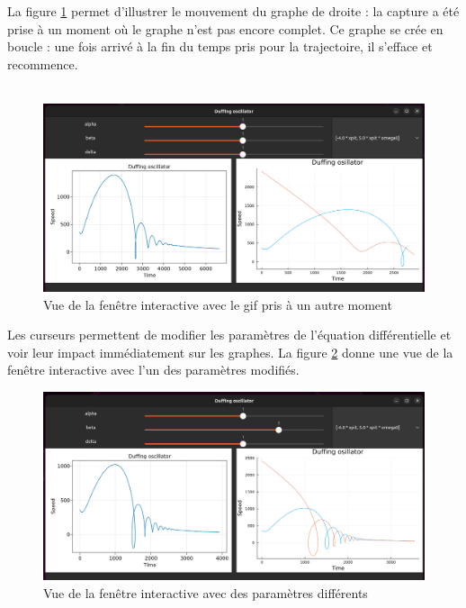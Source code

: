 \documentclass[a4paper, french, 12pt, titlepage]{article}
\begin{document}
La figure \ref{fig:fig3} permet d'illustrer le mouvement du graphe de droite : la capture a été prise à un moment où le graphe n'est pas encore complet. 
Ce graphe se crée en boucle : une fois arrivé à la fin du temps pris pour la trajectoire, il s'efface et recommence. \\
\\

\begin{figure}[htb]
  \includegraphics[width=\linewidth]{interactivewindow_2.png}
  \caption{Vue de la fenêtre interactive avec le gif pris à un autre moment}
  \label{fig:fig3}
\end{figure}


Les curseurs permettent de modifier les paramètres de l'équation différentielle et voir leur impact immédiatement sur les graphes. 
La figure \ref{fig:fig4} donne une vue de la fenêtre interactive avec l'un des paramètres modifiés. \\


\begin{figure}[H]
  \includegraphics[width=\linewidth]{interactivewindow_3.png}
  \caption{Vue de la fenêtre interactive avec des paramètres différents}
  \label{fig:fig4}
\end{figure}
\end{document}
